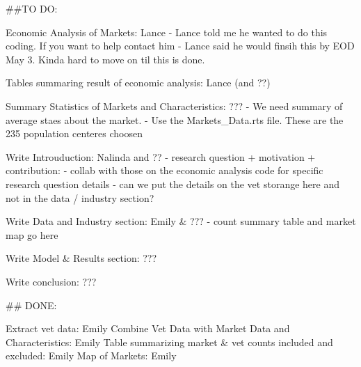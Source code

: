 ##TO DO:

Economic Analysis of Markets: Lance
    - Lance told me he wanted to do this coding. If you want to help contact him
    - Lance said he would finsih this by EOD May 3. Kinda hard to move on til this is done. 

Tables summaring result of economic analysis: Lance (and ??)

Summary Statistics of Markets and Characteristics: ???
    - We need summary of average staes about the market. 
    - Use the Markets_Data.rts file. These are the 235 population centeres choosen

Write Introuduction: Nalinda and ??
    - research question + motivation + contribution: 
    - collab with those on the economic analysis code for specific research question details 
    - can we put the details on the vet storange here and not in the data / industry section? 

Write Data and Industry section: Emily & ???
    - count summary table and market map go here 

Write Model & Results section: ???

Write conclusion:  ???

## DONE: 

Extract vet data: Emily 
Combine Vet Data with Market Data and Characteristics: Emily 
Table summarizing market & vet counts included and excluded: Emily
Map of Markets: Emily 
